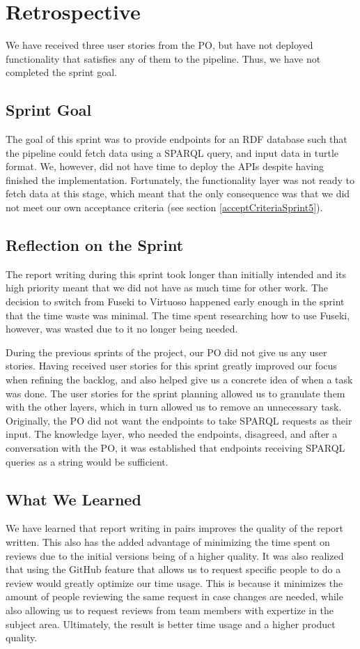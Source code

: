 \section{Retrospective}
We have received three user stories from the PO, but have not deployed functionality that satisfies any of them to the \knox{} pipeline. Thus, we have not completed the sprint goal.

\subsection{Sprint Goal}
The goal of this sprint was to provide endpoints for an RDF database such that the \knox{} pipeline could fetch data using a SPARQL query, and input data in turtle format. We, however, did not have time to deploy the APIs despite having finished the implementation. Fortunately, the functionality layer was not ready to fetch data at this stage, which meant that the only consequence was that we did not meet our own acceptance criteria (see section \ref{acceptCriteriaSprint5}).

\subsection{Reflection on the Sprint}
The report writing during this sprint took longer than initially intended and its high priority meant that we did not have as much time for other work.
The decision to switch from Fuseki to Virtuoso happened early enough in the sprint that the time waste was minimal. The time spent researching how to use Fuseki, however, was wasted due to it no longer being needed.

During the previous sprints of the project, our PO did not give us any user stories. 
Having received user stories for this sprint greatly improved our focus when refining the backlog, and also helped give us a concrete idea of when a task was done. 
The user stories for the sprint planning allowed us to granulate them with the other layers, which in turn allowed us to remove an unnecessary task. Originally, the PO did not want the endpoints to take SPARQL requests as their input.
The knowledge layer, who needed the endpoints, disagreed, and after a conversation with the PO, it was established that endpoints receiving SPARQL queries as a string would be sufficient.

\subsection{What We Learned}
We have learned that report writing in pairs improves the quality of the report written. This also has the added advantage of minimizing the time spent on reviews due to the initial versions being of a higher quality.
It was also realized that using the GitHub feature that allows us to request specific people to do a review would greatly optimize our time usage. 
This is because it minimizes the amount of people reviewing the same request in case changes are needed, while also allowing us to request reviews from team members with expertize in the subject area.
Ultimately, the result is better time usage and a higher product quality. 

